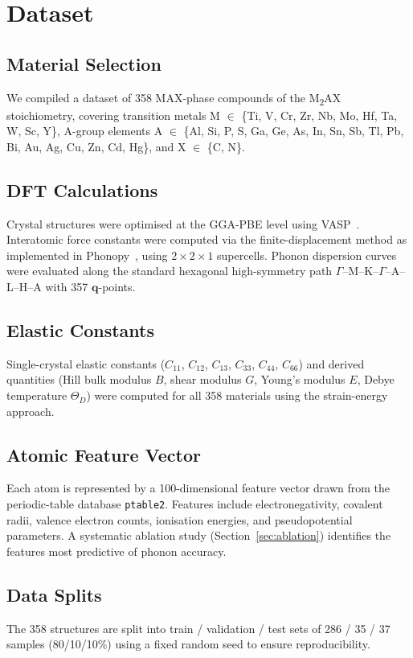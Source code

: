 \section{Dataset}

\subsection{Material Selection}

We compiled a dataset of 358 MAX-phase compounds of the
M\textsubscript{2}AX stoichiometry,
covering transition metals M $\in$ \{Ti, V, Cr, Zr, Nb, Mo,
Hf, Ta, W, Sc, Y\},
A-group elements A $\in$ \{Al, Si, P, S, Ga, Ge, As, In, Sn,
Sb, Tl, Pb, Bi, Au, Ag, Cu, Zn, Cd, Hg\},
and X $\in$ \{C, N\}.

\subsection{DFT Calculations}

Crystal structures were optimised at the GGA-PBE level
using VASP~\cite{Kresse1996}.
Interatomic force constants were computed via the
finite-displacement method as implemented in
Phonopy~\cite{Togo2015},
using $2\times2\times1$ supercells.
Phonon dispersion curves were evaluated along the
standard hexagonal high-symmetry path
$\Gamma$--M--K--$\Gamma$--A--L--H--A with 357 $\mathbf{q}$-points.

\subsection{Elastic Constants}

Single-crystal elastic constants ($C_{11}$, $C_{12}$, $C_{13}$,
$C_{33}$, $C_{44}$, $C_{66}$) and derived quantities
(Hill bulk modulus $B$, shear modulus $G$,
Young's modulus $E$, Debye temperature $\Theta_D$)
were computed for all 358 materials using the strain-energy approach.

\subsection{Atomic Feature Vector}

Each atom is represented by a 100-dimensional feature vector
drawn from the periodic-table database \texttt{ptable2}.
Features include electronegativity, covalent radii, valence
electron counts, ionisation energies, and pseudopotential
parameters.
A systematic ablation study (Section~\ref{sec:ablation})
identifies the features most predictive of phonon accuracy.

\subsection{Data Splits}

The 358 structures are split into
train / validation / test sets of
286 / 35 / 37 samples (80/10/10\%)
using a fixed random seed to ensure reproducibility.
